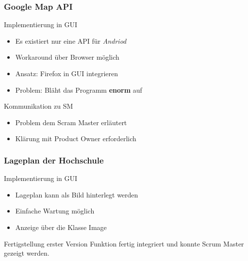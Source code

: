 \begin{frame}
	\frametitle{Google Map API}
%
	\begin{block}{Implementierung in GUI}
		\begin{itemize}
			\item Es existiert nur eine API für \textit{Andriod}
			\item Workaround über Browser möglich
			\item Ansatz: Firefox in GUI integrieren
			\item Problem: Bläht das Programm \textbf{enorm} auf
		\end{itemize}
	\end{block}
%
	\begin{block}{Kommunikation zu SM}
		\begin{itemize}
			\item Problem dem Scram Master erläutert
			\item Klärung mit Product Owner erforderlich
		\end{itemize}
	\end{block}
\end{frame}
%
%
%
\begin{frame}
	\frametitle{Lageplan der Hochschule}
%
	\begin{block}{Implementierung in GUI}
		\begin{itemize}
			\item Lageplan kann als Bild hinterlegt werden
			\item Einfache Wartung möglich
			\item Anzeige über die Klasse Image
		\end{itemize}
	\end{block}
%
	\begin{block}{Fertigstellung erster Version}
		Funktion fertig integriert und konnte Scrum Master gezeigt werden.	
	\end{block}
\end{frame}